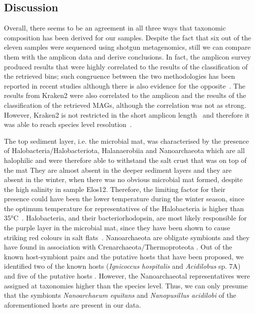 \subsection{Discussion}
\label{swamp:discussion}

   Overall, there seems to be an agreement in all three ways that taxonomic composition has been derived for our samples. 
   Despite the fact that six out of the eleven samples were sequenced using shotgun metagenomics, 
   still we can compare them with the amplicon data and derive conclusions. In fact, the amplicon survey produced results 
   that were highly correlated to the results of the classification of the retrieved bins; 
   such congruence between the two methodologies has been reported in recent studies 
   \citep{chan_diversity_2015, regalado_combining_2020}
   although there is also evidence for the opposite~\citep{tessler_large-scale_2017}. 
   The results from Kraken2 were also correlated to the amplicon and the results of the classification of the retrieved MAGs, 
   although the correlation was not as strong. 
   However, Kraken2 is not restricted in the short amplicon length~\citep{johnson_evaluation_2019} 
   and therefore it was able to reach species level resolution~\citep{lu_ultrafast_2020}.

   The top sediment layer, i.e. the microbial mat, was characterised by the presence of Halobacteria/Halobacteriota, 
   Halanaerobiia and Nanoarchaeota which are all halophilic and were therefore able to withstand the salt crust that was on top of the mat 
   \citep{norton_archaeal_1993, casanueva_nanoarchaeal_2008, cinar_prokaryotic_2020, akpolat_prokaryotic_2021}
   They are almost absent in the deeper sediment layers and they are absent in the winter, 
   when there was no obvious microbial mat formed, despite the high salinity in sample Elos12. 
   Therefore, the limiting factor for their presence could have been the lower temperature during the winter season, 
   since the optimum temperature for representatives of the Halobacteria is higher than 35°C~\citep{grant_halobacterium_2015}. 
   Halobacteria, and their bacteriorhodopsin, are most likely responsible for the purple layer in the microbial mat, 
   since they have been shown to cause striking red colours in salt flats~\citep{stoeckenius_bacteriorhodopsin_1979}. 
   Nanoarchaeota are obligate symbionts and they have found in association with Crenarchaeota/Thermoproteota 
   \citep{huber_new_2002, podar_insights_2013, munson-mcgee_nanoarchaeota_2015, wurch_genomics-informed_2016, merkel_microbial_2017}.
   Out of the known host-symbiont pairs and the putative hosts that have been proposed, we identified two of the known hosts 
   (\textit{Ignicoccus hospitalis} and \textit{Acidilobus} sp. 7A) 
   and five of the putative hosts \citep{jarett_single-cell_2018}. 
   However, the Nanoarchaeotal representatives were assigned at taxonomies higher than the species level. 
   Thus, we can only presume that the symbionts \textit{Nanoarchaeum equitans} and \textit{Nanopusillus acidilobi} 
   of the aforementioned hosts are present in our data. 

